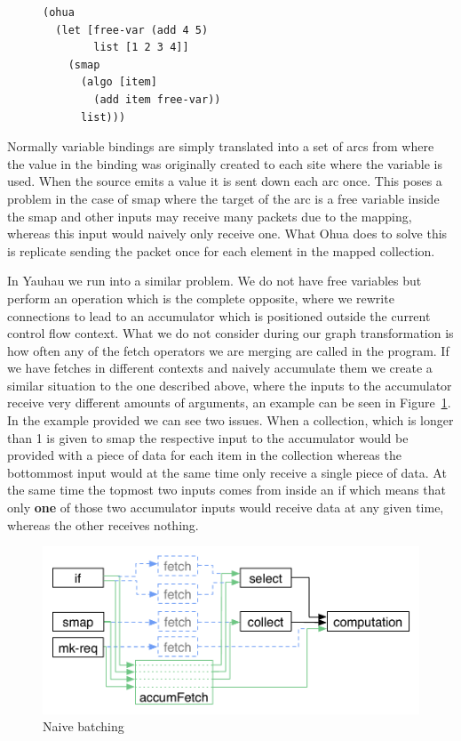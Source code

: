 \begin{figure}
\begin{verbatim}
(ohua
  (let [free-var (add 4 5)
        list [1 2 3 4]]
    (smap
      (algo [item]
        (add item free-var))
      list)))
\end{verbatim}
\end{figure}

Normally variable bindings are simply translated into a set of arcs from where the value in the binding was originally created to each site where the variable is used.
When the source emits a value it is sent down each arc once.
This poses a problem in the case of smap where the target of the arc is a free variable inside the smap and other inputs may receive many packets due to the mapping, whereas this input would naively only receive one.
What Ohua does to solve this is replicate sending the packet once for each element in the mapped collection.

In Yauhau we run into a similar problem.
We do not have free variables but perform an operation which is the complete opposite, where we rewrite connections to lead to an accumulator which is positioned outside the current control flow context.
What we do not consider during our graph transformation is how often any of the fetch operators we are merging are called in the program.
If we have fetches in different contexts and naively accumulate them we create a similar situation to the one described above, where the inputs to the accumulator receive very different amounts of arguments, an example can be seen in Figure~\ref{fig:naive-batching-context-problem}.
In the example provided we can see two issues.
When a collection, which is longer than 1 is given to smap the respective input to the accumulator would be provided with a piece of data for each item in the collection whereas the bottommost input would at the same time only receive a single piece of data.
At the same time the topmost two inputs comes from inside an if which means that only \textbf{one} of those two accumulator inputs would receive data at any given time, whereas the other receives nothing.

\begin{figure}
    \includegraphics[width=\textwidth]{../Figures/naive-transformation}
	\caption{Naive batching}
	\label{fig:naive-batching-context-problem}
\end{figure}

